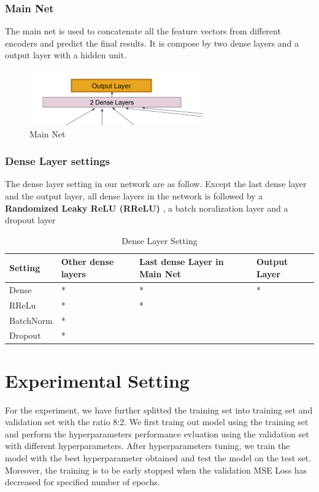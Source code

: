 \documentclass{article}
\begin{document}
\subsubsection{Main Net}

The main net is used to concatenate all the feature vectors from different encoders and predict the final results. It is compose by two dense layers and a output layer with a hidden unit.

\pagebreak

\begin{figure}[h]
  \centering
  \includegraphics[scale=1]{main.png}
  \caption{Main Net}
\end{figure}

\subsubsection{Dense Layer settings}

The dense layer setting in our network are as follow. Except the last dense layer and the output layer, all dense layers in the network is followed by a \textbf{Randomized Leaky ReLU (RReLU)} , a batch noralization layer and a dropout layer

\begin{table}[htb]
	\caption{Dense Layer Setting}
	\label{sample-table}
	\centering
	\begin{tabular}{llll}
		\toprule
		\cmidrule{1-4}
		Setting & Other dense layers  & Last dense Layer in Main Net & Output Layer \\
		\midrule
		Dense & * & * & *\\
		RReLu & * & *\\
		BatchNorm & * &\\
		Dropout & * &\\
		\midrule
	\end{tabular}
\end{table}



\section{Experimental Setting}

For the experiment, we have further splitted the training set into training set and validation set with the ratio 8:2. We first traing out model using the training set and perform the hyperparameters performance evluation using the validation set with different hyperparameters. After hyperparameters tuning, we train the model with the best hyperparameter obtained and test the model on the test set. Moreover, the training is to be early stopped when the validation MSE Loss has decreased for specified number of epochs.
\end{document}
